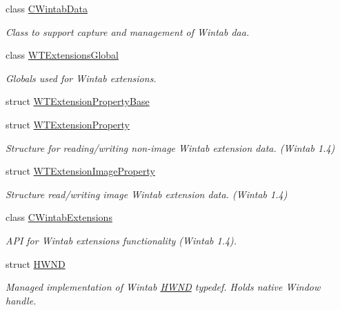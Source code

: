 \begin{DoxyCompactItemize}
class \hyperlink{class_wintab_d_n_1_1_c_wintab_data}{CWintabData}
\begin{DoxyCompactList}\small\item\em Class to support capture and management of Wintab daa. \item\end{DoxyCompactList}\item 
class \hyperlink{class_wintab_d_n_1_1_w_t_extensions_global}{WTExtensionsGlobal}
\begin{DoxyCompactList}\small\item\em Globals used for Wintab extensions. \item\end{DoxyCompactList}\item 
struct \hyperlink{struct_wintab_d_n_1_1_w_t_extension_property_base}{WTExtensionPropertyBase}
\item 
struct \hyperlink{struct_wintab_d_n_1_1_w_t_extension_property}{WTExtensionProperty}
\begin{DoxyCompactList}\small\item\em Structure for reading/writing non-\/image Wintab extension data. (Wintab 1.4) \item\end{DoxyCompactList}\item 
struct \hyperlink{struct_wintab_d_n_1_1_w_t_extension_image_property}{WTExtensionImageProperty}
\begin{DoxyCompactList}\small\item\em Structure read/writing image Wintab extension data. (Wintab 1.4) \item\end{DoxyCompactList}\item 
class \hyperlink{class_wintab_d_n_1_1_c_wintab_extensions}{CWintabExtensions}
\begin{DoxyCompactList}\small\item\em API for Wintab extensions functionality (Wintab 1.4). \item\end{DoxyCompactList}\item 
struct \hyperlink{struct_wintab_d_n_1_1_h_w_n_d}{HWND}
\begin{DoxyCompactList}\small\item\em Managed implementation of Wintab \hyperlink{struct_wintab_d_n_1_1_h_w_n_d}{HWND} typedef. Holds native Window handle. \item\end{DoxyCompactList}\item 

\end{DoxyCompactItemize}
